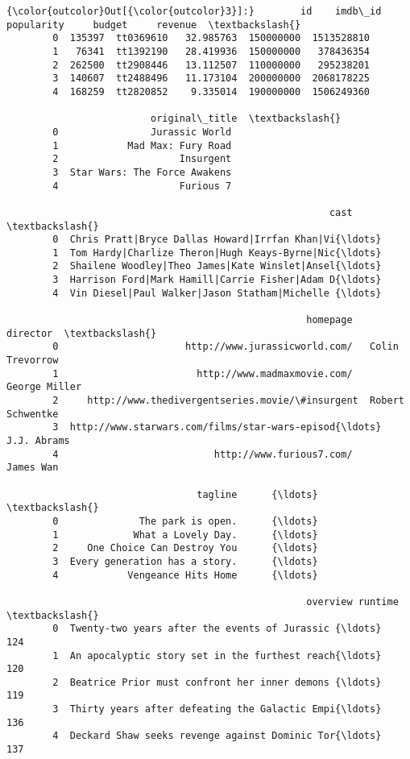 \documentclass[11pt]{article}
\begin{document}
\begin{Verbatim}[commandchars=\\\{\}]
{\color{outcolor}Out[{\color{outcolor}3}]:}        id    imdb\_id  popularity     budget     revenue  \textbackslash{}
        0  135397  tt0369610   32.985763  150000000  1513528810   
        1   76341  tt1392190   28.419936  150000000   378436354   
        2  262500  tt2908446   13.112507  110000000   295238201   
        3  140607  tt2488496   11.173104  200000000  2068178225   
        4  168259  tt2820852    9.335014  190000000  1506249360   
        
                         original\_title  \textbackslash{}
        0                Jurassic World   
        1            Mad Max: Fury Road   
        2                     Insurgent   
        3  Star Wars: The Force Awakens   
        4                     Furious 7   
        
                                                        cast  \textbackslash{}
        0  Chris Pratt|Bryce Dallas Howard|Irrfan Khan|Vi{\ldots}   
        1  Tom Hardy|Charlize Theron|Hugh Keays-Byrne|Nic{\ldots}   
        2  Shailene Woodley|Theo James|Kate Winslet|Ansel{\ldots}   
        3  Harrison Ford|Mark Hamill|Carrie Fisher|Adam D{\ldots}   
        4  Vin Diesel|Paul Walker|Jason Statham|Michelle {\ldots}   
        
                                                    homepage          director  \textbackslash{}
        0                      http://www.jurassicworld.com/   Colin Trevorrow   
        1                        http://www.madmaxmovie.com/     George Miller   
        2     http://www.thedivergentseries.movie/\#insurgent  Robert Schwentke   
        3  http://www.starwars.com/films/star-wars-episod{\ldots}       J.J. Abrams   
        4                           http://www.furious7.com/         James Wan   
        
                                 tagline      {\ldots}       \textbackslash{}
        0              The park is open.      {\ldots}        
        1             What a Lovely Day.      {\ldots}        
        2     One Choice Can Destroy You      {\ldots}        
        3  Every generation has a story.      {\ldots}        
        4            Vengeance Hits Home      {\ldots}        
        
                                                    overview runtime  \textbackslash{}
        0  Twenty-two years after the events of Jurassic {\ldots}     124   
        1  An apocalyptic story set in the furthest reach{\ldots}     120   
        2  Beatrice Prior must confront her inner demons {\ldots}     119   
        3  Thirty years after defeating the Galactic Empi{\ldots}     136   
        4  Deckard Shaw seeks revenge against Dominic Tor{\ldots}     137   
        

\end{Verbatim}
\end{document}
